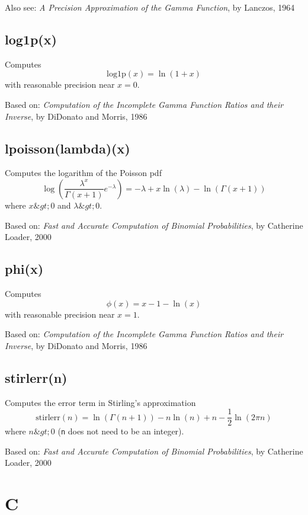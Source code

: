 \documentclass{article}
\begin{document}
Also see: \emph{A Precision Approximation of the Gamma Function}, by
Lanczos, 1964


    \subsection*{log1p(x)}
    Computes $$\textrm{log1p}(x) = \ln(1+x)$$ with reasonable precision near $x = 0$.


Based on:  \emph{Computation of the Incomplete Gamma Function Ratios
and their Inverse}, by DiDonato and Morris, 1986


    \subsection*{lpoisson(lambda)(x)}
    Computes the logarithm of the Poisson pdf
$$\log\left(\frac{\lambda^x}{\Gamma(x+1)}e^{-\lambda}\right)
= -\lambda + x \ln(\lambda) - \ln(\Gamma(x+1))$$
where $x\&gt;0$ and $\lambda\&gt;0$.


Based on:  \emph{Fast and Accurate Computation of Binomial Probabilities},
by Catherine Loader, 2000


    \subsection*{phi(x)}
    Computes $$\phi(x) = x - 1 - \ln(x)$$ with reasonable precision
near $x = 1$.


Based on:  \emph{Computation of the Incomplete Gamma Function Ratios
and their Inverse}, by DiDonato and Morris, 1986


    \subsection*{stirlerr(n)}
    Computes the error term in Stirling's approximation
$$\textrm{stirlerr}(n) = \ln(\Gamma(n+1)) - n \ln(n) + n - \frac{1}{2} \ln\left(2\pi n\right)$$
where $n\&gt;0$ (\texttt{n} does not need to be an integer).


Based on:  \emph{Fast and Accurate Computation of Binomial Probabilities},
by Catherine Loader, 2000


  \section{C}
\end{document}
